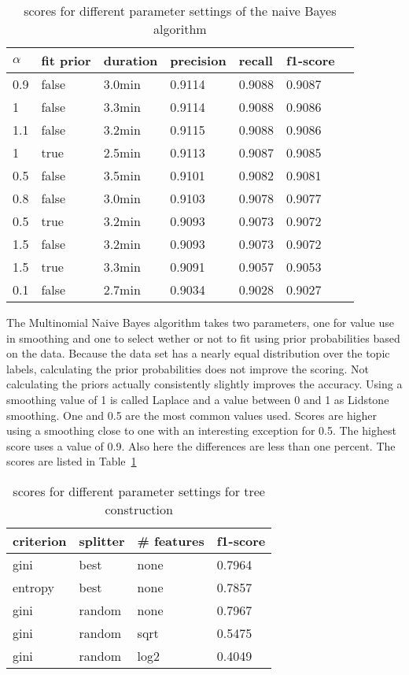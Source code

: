 \documentclass[11pt]{article}
\begin{document}
\begin{table}[ht]\footnotesize
\centering
\begin{tabular}{ l l l l l l l }
$\alpha$  & fit prior & duration & precision & recall & f1-score \\
\hline
0.9 & false & 3.0min & 0.9114 & 0.9088 & 0.9087 \\
1 & false & 3.3min & 0.9114 & 0.9088 & 0.9086 \\
1.1 & false & 3.2min & 0.9115 & 0.9088 & 0.9086 \\
1 & true & 2.5min & 0.9113 & 0.9087 & 0.9085 \\
0.5 & false & 3.5min & 0.9101 & 0.9082 & 0.9081 \\
0.8 & false & 3.0min & 0.9103 & 0.9078 & 0.9077 \\
0.5 & true & 3.2min & 0.9093 & 0.9073 & 0.9072 \\
1.5 & false & 3.2min & 0.9093 & 0.9073 & 0.9072 \\
1.5 & true & 3.3min & 0.9091 & 0.9057 & 0.9053 \\
0.1 & false & 2.7min & 0.9034 & 0.9028 & 0.9027 \\
\end{tabular}
\caption{scores for different parameter settings of the naive Bayes algorithm}
\label{tab:tune-bayes}
\end{table}

The Multinomial Naive Bayes algorithm takes two parameters, one for value use in smoothing and one to select wether or not to fit using prior probabilities based on the data. Because the data set has a nearly equal distribution over the topic labels, calculating the prior probabilities does not improve the scoring. Not calculating the priors actually consistently slightly improves the accuracy. Using a smoothing value of 1 is called Laplace and a value between 0 and 1 as Lidstone smoothing. One and 0.5 are the most common values used. Scores are higher using a smoothing close to one with an interesting exception for 0.5. The highest score uses a value of 0.9. Also here the differences are less than one percent. The scores are listed in Table~\ref{tab:tune-bayes}


\begin{table}[ht]\footnotesize
\centering
\begin{tabular}{ l l l l }
criterion & splitter & \# features & f1-score \\
\hline
gini & best & none &  0.7964 \\
entropy & best & none &  0.7857 \\
gini & random & none &  0.7967 \\
gini & random & sqrt & 0.5475 \\
gini & random & log2 & 0.4049 \\
\end{tabular}
\caption{scores for different parameter settings for tree construction}
\label{tab:tune-tree-split}
\end{table}
\end{document}
